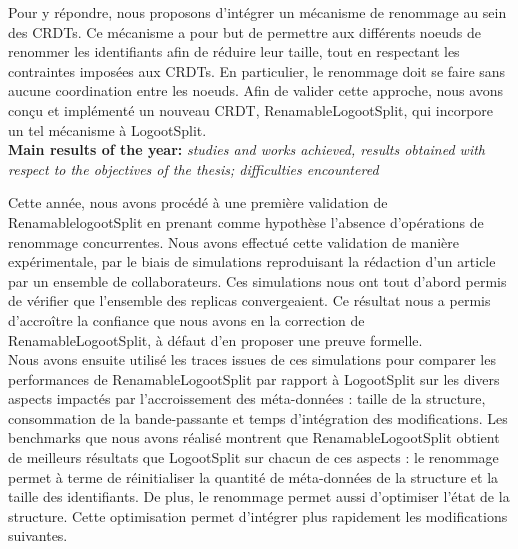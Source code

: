 \documentclass[12pt]{article}
\newcommand{\commentaire}[1]{\small\textit{#1}}
\begin{document}
Pour y répondre, nous proposons d'intégrer un mécanisme de renommage au sein des \acp{CRDT}.
Ce mécanisme a pour but de permettre aux différents noeuds de renommer les identifiants afin de réduire leur taille, tout en respectant les contraintes imposées aux \acp{CRDT}.
En particulier, le renommage doit se faire sans aucune coordination entre les noeuds.
Afin de valider cette approche, nous avons conçu et implémenté un nouveau \ac{CRDT}, RenamableLogootSplit, qui incorpore un tel mécanisme à LogootSplit.
\\

\noindent\textbf{Main results of the year:}
\commentaire{%
  studies and works achieved, results obtained with respect to the
  objectives of the thesis; difficulties encountered\\}


Cette année, nous avons procédé à une première validation de RenamablelogootSplit en prenant comme hypothèse l'absence d'opérations de renommage concurrentes.
Nous avons effectué cette validation de manière expérimentale, par le biais de simulations reproduisant la rédaction d'un article par un ensemble de collaborateurs.
Ces simulations nous ont tout d'abord permis de vérifier que l'ensemble des replicas convergeaient.
Ce résultat nous a permis d'accroître la confiance que nous avons en la correction de RenamableLogootSplit, à défaut d'en proposer une preuve formelle.
\\

Nous avons ensuite utilisé les traces issues de ces simulations pour comparer les performances de RenamableLogootSplit par rapport à LogootSplit sur les divers aspects impactés par l'accroissement des méta-données : taille de la structure, consommation de la bande-passante et temps d'intégration des modifications.
Les benchmarks que nous avons réalisé montrent que RenamableLogootSplit obtient de meilleurs résultats que LogootSplit sur chacun de ces aspects :
le renommage permet à terme de réinitialiser la quantité de méta-données de la structure et la taille des identifiants.
De plus, le renommage permet aussi d'optimiser l'état de la structure.
Cette optimisation permet d'intégrer plus rapidement les modifications suivantes.
\\
\end{document}
